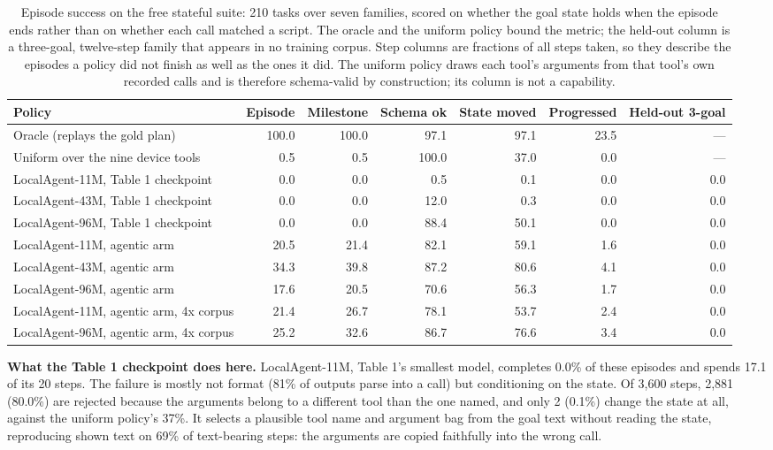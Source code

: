 \documentclass{article}
\begin{document}
\begin{table}[htbp]
\caption{Episode success on the free stateful suite: 210 tasks over seven families, scored on whether the goal state holds when the episode ends rather than on whether each call matched a script. The oracle and the uniform policy bound the metric; the held-out column is a three-goal, twelve-step family that appears in no training corpus. Step columns are fractions of all steps taken, so they describe the episodes a policy did not finish as well as the ones it did. The uniform policy draws each tool's arguments from that tool's own recorded calls and is therefore schema-valid by construction; its column is not a capability.}
\label{tab:episodes}
\centering
\footnotesize
\begin{tabular}{lrrrrrr}
\toprule
Policy & Episode & Milestone & Schema ok & State moved & Progressed & Held-out 3-goal \\
\midrule
Oracle (replays the gold plan) & 100.0 & 100.0 & 97.1 & 97.1 & 23.5 & --- \\
Uniform over the nine device tools & 0.5 & 0.5 & 100.0 & 37.0 & 0.0 & --- \\
LocalAgent-11M, Table 1 checkpoint & 0.0 & 0.0 & 0.5 & 0.1 & 0.0 & 0.0 \\
LocalAgent-43M, Table 1 checkpoint & 0.0 & 0.0 & 12.0 & 0.3 & 0.0 & 0.0 \\
LocalAgent-96M, Table 1 checkpoint & 0.0 & 0.0 & 88.4 & 50.1 & 0.0 & 0.0 \\
LocalAgent-11M, agentic arm & 20.5 & 21.4 & 82.1 & 59.1 & 1.6 & 0.0 \\
LocalAgent-43M, agentic arm & 34.3 & 39.8 & 87.2 & 80.6 & 4.1 & 0.0 \\
LocalAgent-96M, agentic arm & 17.6 & 20.5 & 70.6 & 56.3 & 1.7 & 0.0 \\
LocalAgent-11M, agentic arm, 4x corpus & 21.4 & 26.7 & 78.1 & 53.7 & 2.4 & 0.0 \\
LocalAgent-96M, agentic arm, 4x corpus & 25.2 & 32.6 & 86.7 & 76.6 & 3.4 & 0.0 \\
\bottomrule
\end{tabular}
\end{table}


\textbf{What the Table 1 checkpoint does here.} LocalAgent-11M, Table 1's smallest model, completes 0.0\% of these episodes and spends 17.1 of its 20 steps. The failure is mostly not format (81\% of outputs parse into a call) but conditioning on the state. Of 3,600 steps, 2,881 (80.0\%) are rejected because the arguments belong to a different tool than the one named, and only 2 (0.1\%) change the state at all, against the uniform policy's 37\%. It selects a plausible tool name and argument bag from the goal text without reading the state, reproducing shown text on 69\% of text-bearing steps: the arguments are copied faithfully into the wrong call.
\end{document}
